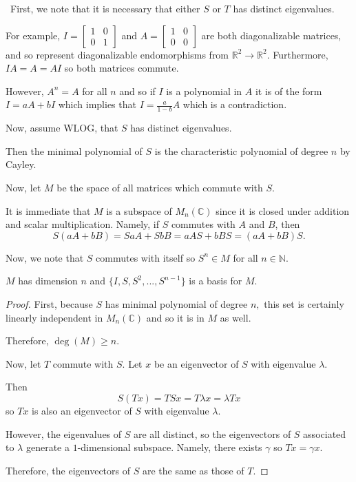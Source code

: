 \documentclass[12pt]{AlgebraQual}
\begin{document}
\begin{solution}$\,$
First, we note that it is necessary that either $S$ or $T$ has distinct eigenvalues.

For example, $I=\begin{bmatrix}
1 & 0\\
0 & 1
\end{bmatrix}$ and $A=\begin{bmatrix}
1 & 0\\
0 & 0
\end{bmatrix}$ are both diagonalizable matrices, and so represent diagonalizable endomorphisms from $\mathbb{R}^2\to\mathbb{R}^2$. Furthermore, $IA=A=AI$ so both matrices commute.

However, $A^n=A$ for all $n$ and so if $I$ is a polynomial in $A$ it is of the form $I=aA+bI$ which implies that $I=\frac{a}{1-b}A$ which is a contradiction.

Now, assume WLOG, that $S$ has distinct eigenvalues.

Then the minimal polynomial of $S$ is the characteristic polynomial of degree $n$ by Cayley.

Now, let $M$ be the space of all matrices which commute with $S$.

It is immediate that $M$ is a subspace of $M_n(\mathbb{C})$ since it is closed under addition and scalar multiplication. Namely, if $S$ commutes with $A$ and $B$, then $$S(aA+bB)=SaA+SbB=aAS+bBS=(aA+bB)S.$$

Now, we note that $S$ commutes with itself so $S^n\in M$ for all $n\in\mathbb{N}$.

\begin{claim} $M$ has dimension $n$ and $\{I,S,S^2,...,S^{n-1}\}$ is a basis for $M.$
\begin{proof} First, because $S$ has minimal polynomial of degree $n,$ this set is certainly linearly independent in $M_n(\mathbb{C})$ and so it is in $M$ as well.

Therefore, $\deg(M)\ge n$.

Now, let $T$ commute with $S$. Let $x$ be an eigenvector of $S$ with eigenvalue $\lambda$.

Then $$S(Tx)=TSx=T\lambda x=\lambda Tx$$ so $Tx$ is also an eigenvector of $S$ with eigenvalue $\lambda$.

However, the eigenvalues of $S$ are all distinct, so the eigenvectors of $S$ associated to $\lambda$ generate a $1$-dimensional subspace. Namely, there exists $\gamma$ so $Tx=\gamma x$.

Therefore, the eigenvectors of $S$ are the same as those of $T$.


\end{proof}
\end{claim}
\end{solution}
\end{document}
